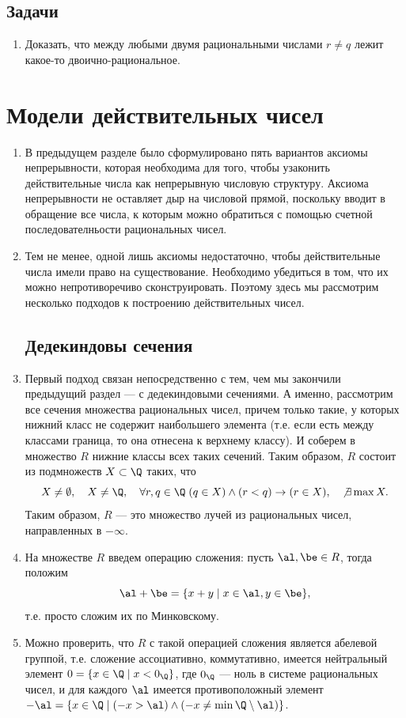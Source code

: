 \subsection*{Задачи}
\begin{enumerate}
\item Доказать, что между любыми двумя рациональными числами $r\ne q$ лежит какое-то двоично-рациональное.
\end{enumerate}


\section{Модели действительных чисел}


\begin{enumerate}
\item В предыдущем разделе было сформулировано пять вариантов аксиомы непрерывности, которая необходима для того, чтобы узаконить действительные числа как непрерывную числовую структуру. Аксиома непрерывности не оставляет дыр на числовой прямой, поскольку вводит в обращение все числа, к которым можно обратиться с помощью счетной последователньости рациональных чисел.
\item Тем не менее, одной лишь аксиомы недостаточно, чтобы действительные числа имели право на существование. Необходимо убедиться в том, что их можно непротиворечиво сконструировать. Поэтому здесь мы рассмотрим несколько подходов к построению действительных чисел.

\subsection*{Дедекиндовы сечения}

\item Первый подход связан непосредственно с тем, чем мы закончили предыдущий раздел --- с дедекиндовыми сечениями. А именно, рассмотрим все сечения множества рациональных чисел, причем только такие, у которых нижний класс не содержит наибольшего элемента (т.е. если есть между классами граница, то она отнесена к верхнему классу). И соберем в множество $R$ нижние классы всех таких сечений. Таким образом, $R$ состоит из подмножеств $X\subset\Q$ таких, что
$$
X\ne\emptyset,\quad X\ne\Q,\quad\forall r,q\in\Q\;(q\in X)\land(r<q)\to(r\in X),\quad\not\exists\max X.
$$
Таким образом, $R$ --- это множество лучей из рациональных чисел, направленных в $-\infty$.
\item На множестве $R$ введем операцию сложения: пусть $\al,\be\in R$, тогда положим
$$
\al+\be = \{x+y\mid x\in \al,y\in \be\},
$$
т.е. просто сложим их по Минковскому.
\item Можно проверить, что $R$ с такой операцией сложения является абелевой группой, т.е. сложение ассоциативно, коммутативно, имеется нейтральный элемент $0=\{x\in\Q\mid x<0_\Q\}$, где $0_\Q$ --- ноль в системе рациональных чисел, и для каждого $\al$ имеется противоположный элемент $-\al=\{x\in\Q\mid (-x>\al)\land (-x\ne\min\Q\setminus\al)\}$.


\end{enumerate}
